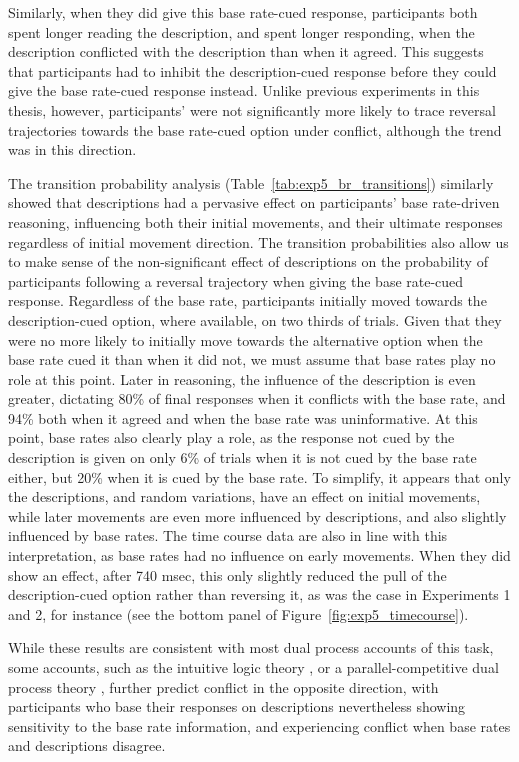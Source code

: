 Similarly, when they did give this base rate-cued response,
participants both spent longer reading the description,
and spent longer responding,
when the description conflicted with the description than when it agreed.
This suggests that
participants had to inhibit the description-cued response
before they could give the base rate-cued response instead.
Unlike previous experiments in this thesis, however,
participants' were not significantly more likely to trace
reversal trajectories towards the base rate-cued option
under conflict, although the trend was in this direction.

The transition probability analysis (Table~\ref{tab:exp5_br_transitions})
similarly showed that descriptions had a pervasive effect
on participants' base rate-driven reasoning,
influencing both their initial movements,
and their ultimate responses regardless of initial movement direction.
The transition probabilities also allow us to
make sense of the non-significant effect of descriptions
on the probability of participants following a reversal trajectory
when giving the base rate-cued response.
Regardless of the base rate,
participants initially moved towards the description-cued option,
where available, on two thirds of trials.
Given that they were no more likely to initially
move towards the alternative option
when the base rate cued it than when it did not,
we must assume that base rates play no role at this point.
Later in reasoning, the influence of the description is even greater, 
dictating 80\% of final responses when it conflicts with the base rate,
and 94\% both when it agreed and when the base rate was uninformative.
At this point, base rates also clearly play a role,
as the response not cued by the description
is given on only 6\% of trials when it is not cued by the base rate either,
but 20\% when it is cued by the base rate.
To simplify, it appears that only the descriptions,
and random variations, have an effect on initial movements,
while later movements are even more influenced by descriptions,
and also slightly influenced by base rates.
The time course data are also in line with this interpretation,
as base rates had no influence on early movements.
When they did show an effect, after 740 msec,
this only slightly reduced the pull of the description-cued option
rather than reversing it,
as was the case in Experiments 1 and 2, for instance
(see the bottom panel of Figure~\ref{fig:exp5_timecourse}).





While these results are consistent with most
dual process accounts of this task,
some accounts, such as the intuitive logic theory \citep{DeNeys2012,Handley2015},
or a parallel-competitive dual process theory \citep{Barbey2007,Sloman1996},
further predict conflict in the opposite direction,
with participants who base their responses on descriptions
nevertheless showing sensitivity to the base rate information,
and experiencing conflict when base rates and descriptions disagree.

